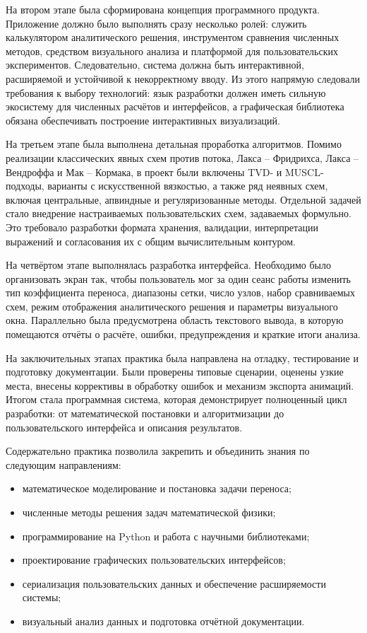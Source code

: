 \documentclass[a4paper,14pt]{extreport}
\begin{document}
На втором этапе была сформирована концепция программного продукта. Приложение должно было выполнять сразу несколько ролей: служить калькулятором аналитического решения, инструментом сравнения численных методов, средством визуального анализа и платформой для пользовательских экспериментов. Следовательно, система должна быть интерактивной, расширяемой и устойчивой к некорректному вводу. Из этого напрямую следовали требования к выбору технологий: язык разработки должен иметь сильную экосистему для численных расчётов и интерфейсов, а графическая библиотека обязана обеспечивать построение интерактивных визуализаций.

На третьем этапе была выполнена детальная проработка алгоритмов. Помимо реализации классических явных схем против потока, Лакса -- Фридрихса, Лакса -- Вендроффа и Мак -- Кормака, в проект были включены TVD- и MUSCL-подходы, варианты с искусственной вязкостью, а также ряд неявных схем, включая центральные, апвиндные и регуляризованные методы. Отдельной задачей стало внедрение настраиваемых пользовательских схем, задаваемых формульно. Это требовало разработки формата хранения, валидации, интерпретации выражений и согласования их с общим вычислительным контуром.

На четвёртом этапе выполнялась разработка интерфейса. Необходимо было организовать экран так, чтобы пользователь мог за один сеанс работы изменить тип коэффициента переноса, диапазоны сетки, число узлов, набор сравниваемых схем, режим отображения аналитического решения и параметры визуального окна. Параллельно была предусмотрена область текстового вывода, в которую помещаются отчёты о расчёте, ошибки, предупреждения и краткие итоги анализа.

На заключительных этапах практика была направлена на отладку, тестирование и подготовку документации. Были проверены типовые сценарии, оценены узкие места, внесены коррективы в обработку ошибок и механизм экспорта анимаций. Итогом стала программная система, которая демонстрирует полноценный цикл разработки: от математической постановки и алгоритмизации до пользовательского интерфейса и описания результатов.

Содержательно практика позволила закрепить и объединить знания по следующим направлениям:

\begin{itemize}
    \item математическое моделирование и постановка задачи переноса;
    \item численные методы решения задач математической физики;
    \item программирование на Python и работа с научными библиотеками;
    \item проектирование графических пользовательских интерфейсов;
    \item сериализация пользовательских данных и обеспечение расширяемости системы;
    \item визуальный анализ данных и подготовка отчётной документации.
\end{itemize}
\end{document}
